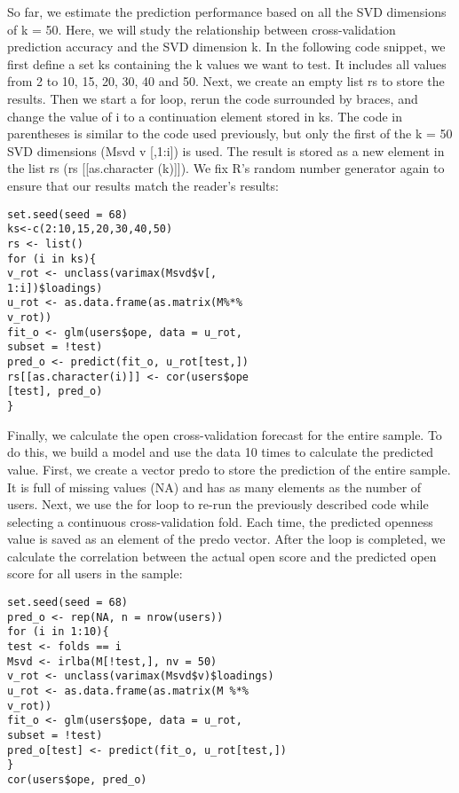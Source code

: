 So far, we estimate the prediction performance based on all the SVD
 dimensions of k = 50. Here, we will study the relationship between
 cross-validation prediction accuracy and the SVD dimension k. In 
the following code snippet, we first define a set ks containing the
 k values we want to test. It includes all values from 2 to 10, 15,
 20, 30, 40 and 50. Next, we create an empty list rs to store the 
results. Then we start a for loop, rerun the code surrounded by 
braces, and change the value of i to a continuation element stored
 in ks. The code in parentheses is similar to the code used 
previously, but only the first of the k = 50 SVD dimensions (Msvd 
 v [,1:i]) is used. The result is stored as a new element in the 
list rs (rs [[as.character (k)]]). We fix R's random number generator
 again to ensure that our results match the reader's results:

\begin{verbatim}
set.seed(seed = 68)
ks<-c(2:10,15,20,30,40,50)
rs <- list()
for (i in ks){
v_rot <- unclass(varimax(Msvd$v[,
1:i])$loadings)
u_rot <- as.data.frame(as.matrix(M%*%
v_rot))
fit_o <- glm(users$ope, data = u_rot,
subset = !test)
pred_o <- predict(fit_o, u_rot[test,])
rs[[as.character(i)]] <- cor(users$ope
[test], pred_o)
}
\end{verbatim}

Finally, we calculate the open cross-validation forecast for the 
entire sample. To do this, we build a model and use the data 10 
times to calculate the predicted value. First, we create a vector 
predo to store the prediction of the entire sample. It is full of 
missing values (NA) and has as many elements as the number of 
users. Next, we use the for loop to re-run the previously described
 code while selecting a continuous cross-validation fold. Each 
time, the predicted openness value is saved as an element of the 
predo vector. After the loop is completed, we calculate the 
correlation between the actual open score and the predicted open 
score for all users in the sample:

\begin{verbatim}
set.seed(seed = 68)
pred_o <- rep(NA, n = nrow(users))
for (i in 1:10){
test <- folds == i
Msvd <- irlba(M[!test,], nv = 50)
v_rot <- unclass(varimax(Msvd$v)$loadings)
u_rot <- as.data.frame(as.matrix(M %*%
v_rot))
fit_o <- glm(users$ope, data = u_rot,
subset = !test)
pred_o[test] <- predict(fit_o, u_rot[test,])
}
cor(users$ope, pred_o)
\end{verbatim}


